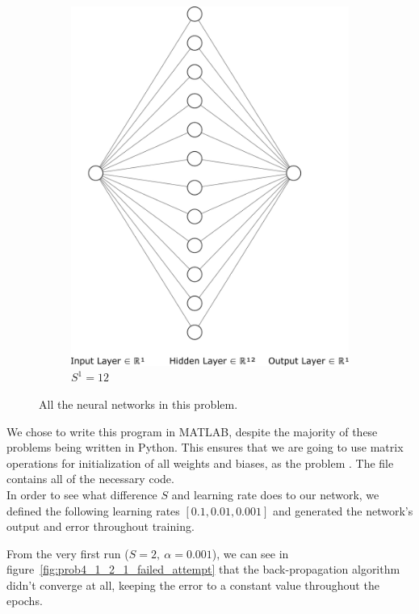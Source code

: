 \begin{figure}[H]
\begin{subfigure}{0.47\textwidth}
		\includegraphics[width=\textwidth]{../Problem 4/nn_1_12_1.pdf}
		\caption{$S^1=12$}
	\end{subfigure}
	\caption{All the neural networks in this problem.}
	\label{fig:prob4_nns}
\end{figure}

We chose to write this program in MATLAB, despite the majority of these problems being written in Python. This ensures that we are going to use matrix operations for initialization of all weights and biases, as the problem .
The file  contains all of the necessary code.\\

In order to see what difference $S$ and learning rate does to our network, we defined the following learning rates $\left[0.1, 0.01, 0.001\right]$ and generated the network's output and error throughout training.

From the very first run ($S=2,\ \alpha=0.001$), we can see in figure~\ref{fig:prob4_1_2_1_failed_attempt} that the back-propagation algorithm didn't converge at all, keeping the error to a constant value throughout the epochs.

